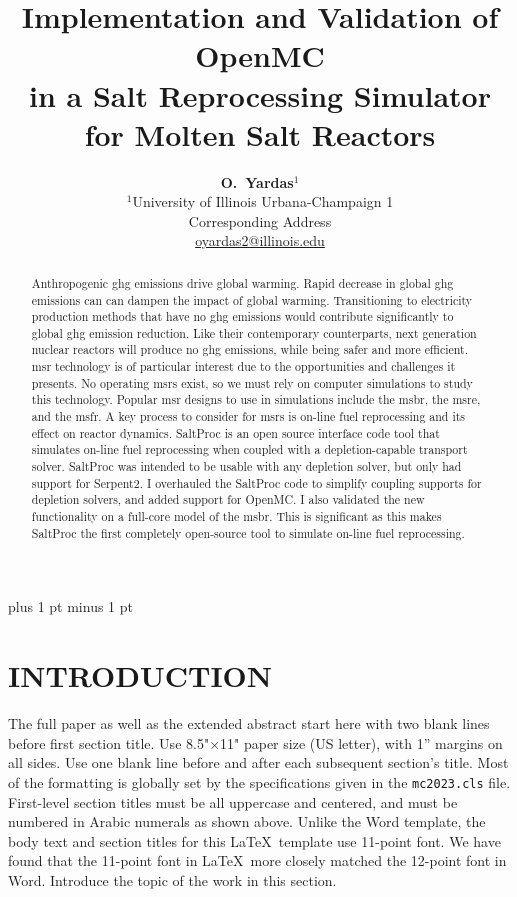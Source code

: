 \documentclass[letterpaper]{mc2023}
\title{Implementation and Validation of OpenMC \\
in a Salt Reprocessing Simulator for Molten Salt Reactors}
\author{%
  \textbf{O.~Yardas$^1$}\vspace{3pt} \\
  $^1$University of Illinois Urbana-Champaign 1  \\
  Corresponding Address \vspace{6pt}\\ 
  \url{oyardas2@illinois.edu}
}
\begin{document}

\maketitle
\justify 
\parskip 6pt plus 1 pt minus 1 pt

\begin{abstract}
  Anthropogenic \Gls{ghg} emissions drive global warming. Rapid decrease in
  global \Gls{ghg} emissions can can dampen the impact of global warming.
  Transitioning to electricity production methods that have no \Gls{ghg}
  emissions would contribute significantly to global \Gls{ghg} emission
  reduction. Like their contemporary counterparts, next generation nuclear
  reactors will produce no \Gls{ghg} emissions, while being safer and more
  efficient. \Gls{msr} technology is of particular interest due to the
  opportunities and challenges it presents. No operating \Gls{msr}s exist, so we
  must rely on computer simulations to study this technology. Popular \Gls{msr}
  designs to use in simulations include the \Gls{msbr}, the \Gls{msre}, and the
  \Gls{msfr}. A key process to consider for \Gls{msr}s is on-line fuel
  reprocessing and its effect on reactor dynamics. SaltProc is an open source
  interface code tool that simulates on-line fuel reprocessing when coupled with
  a depletion-capable transport solver. SaltProc was intended to be usable with
  any depletion solver, but only had support for Serpent2. I overhauled the
  SaltProc code to simplify coupling supports for depletion solvers, and added
  support for OpenMC. I also validated the new functionality on a full-core model
  of the \Gls{msbr}. This is significant as this makes SaltProc the first
  completely open-source tool to simulate on-line fuel reprocessing.
\end{abstract}
\vspace{6pt}

\section{INTRODUCTION} 
The full paper as well as the extended abstract start here with two blank lines before first section title.  Use 
8.5"$\times$11" paper size (US letter), with 1'' margins on all sides.  Use one blank line 
before and after each subsequent section's title.  Most of the formatting is globally
set by the specifications given in the \texttt{mc2023.cls} file.  
First-level section titles must be all uppercase and centered, and must 
be numbered in Arabic numerals as shown above.  Unlike the Word template, the body
text and section titles for this \LaTeX\ template use 
11-point font.  We have found that the 11-point font in \LaTeX\ more closely 
matched the 12-point font in Word.  Introduce the topic of the work 
in this section.
\end{document}
